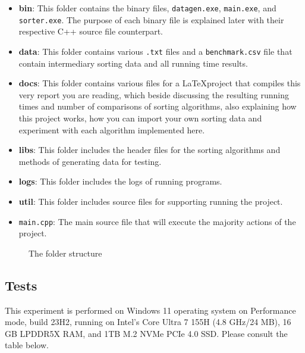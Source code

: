 \documentclass{article}
\begin{document}
\begin{itemize}
	\item \textbf{bin}: This folder contains the binary files, \texttt{datagen.exe}, \texttt{main.exe}, and \texttt{sorter.exe}. The purpose of each binary file is explained later with their respective C++ source file counterpart.
	\item \textbf{data}: This folder contains various \texttt{.txt} files and a \texttt{benchmark.csv} file that contain intermediary sorting data and all running time results.
	\item \textbf{docs}: This folder contains various files for a \LaTeX \space project that compiles this very report you are reading, which beside discussing the resulting running times and number of comparisons of sorting algorithms, also explaining how this project works, how you can import your own sorting data and experiment with each algorithm implemented here.
	\item \textbf{libs}: This folder includes the header files for the sorting algorithms and methods of generating data for testing.
	\item \textbf{logs}: This folder includes the logs of running programs.
	\item \textbf{util}: This folder includes source files for supporting running the project.
	\item \texttt{main.cpp}: The main source file that will execute the majority actions of the project.
\end{itemize}


\pagebreak

\begin{figure}
	\caption{The folder structure}
\end{figure}

\subsection{Tests}
\label{tests}

This experiment is performed on Windows 11 operating system on Performance mode, build 23H2, running on Intel's Core Ultra 7 155H (4.8 GHz/24 MB), 16 GB LPDDR5X RAM, and 1TB M.2 NVMe PCIe 4.0 SSD. Please consult the table below.
\end{document}
